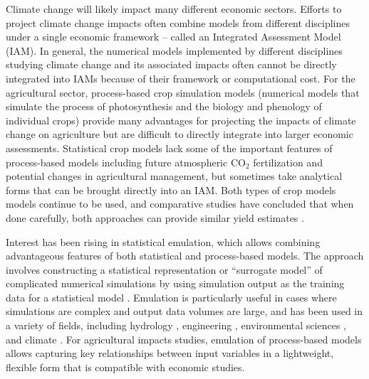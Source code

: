 \documentclass[gmd, manuscript]{copernicus} %
\begin{document}

\introduction
\label{S:1}
Climate change will likely impact many different economic sectors. 
Efforts to project climate change impacts often combine models from different disciplines under a single economic framework -- called an Integrated Assessment Model (IAM). 
In general, the numerical models implemented by different disciplines studying climate change and its associated impacts often cannot be directly integrated into IAMs because of their framework or computational cost.
For the agricultural sector, process-based crop simulation models (numerical models that simulate the process of photosynthesis and the biology and phenology of individual crops) provide many advantages for projecting the impacts of climate change on agriculture but are difficult to directly integrate into larger economic assessments. 
Statistical crop models lack some of the important features of process-based models including future atmospheric CO$_2$ fertilization and potential changes in agricultural management, but sometimes take analytical forms that can be brought directly into an IAM. 
Both types of crop models models continue to be used, and comparative studies have concluded that when done carefully, both approaches can provide similar yield estimates \citep[e.g.][]{Lobell2010, Moore2017, Roberts2017, zhao2017}. 

Interest has been rising in statistical emulation, which allows combining advantageous features of both statistical and process-based models. 
The approach involves constructing a statistical representation or ``surrogate model'' of complicated numerical simulations by using simulation output as the training data for a statistical model \citep[e.g.][]{OHAGAN2006, OHAGAN2010}. 
Emulation is particularly useful in cases where simulations are complex and output data volumes are large,  and  has been used in a variety of fields, including hydrology \citep[e.g.][]{Razavi2012}, engineering \citep[e.g.][]{STORLIE2009}, environmental sciences \citep[e.g.][]{RATTO2012}, and climate \citep[e.g.][]{Castruccio14, Holden2014}. 
For agricultural impacts studies, emulation of process-based models allows capturing key relationships between input variables in a lightweight, flexible form that is compatible with economic studies. 
\end{document}
